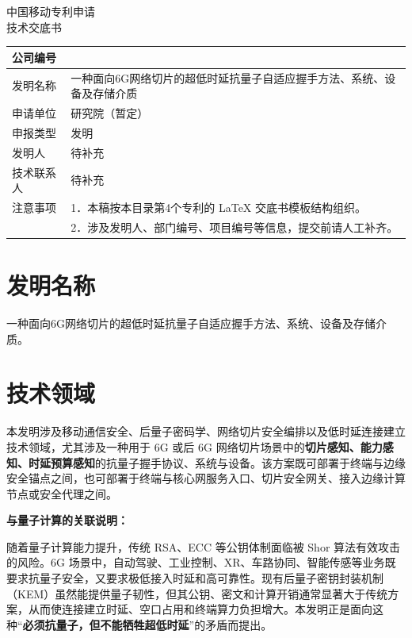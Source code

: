 \documentclass[12pt,a4paper]{article}
\begin{document}
\begin{center}
    {\Large\heiti 中国移动专利申请} \\[1em]
    {\Huge\heiti 技术交底书} \\[1em]
\end{center}

\noindent
\begin{tabular}{|p{3cm}|p{12cm}|}
\hline
公司编号 &  \\ \hline
发明名称 & 一种面向6G网络切片的超低时延抗量子自适应握手方法、系统、设备及存储介质 \\ \hline
申请单位 & 研究院（暂定） \\ \hline
申报类型 & 发明 \\ \hline
发明人 & 待补充 \\ \hline
技术联系人 & 待补充 \\ \hline
注意事项 & 1．本稿按本目录第4个专利的 LaTeX 交底书模板结构组织。\\
& 2．涉及发明人、部门编号、项目编号等信息，提交前请人工补齐。 \\ \hline
\end{tabular}

\vspace{1cm}

\section{发明名称}

一种面向6G网络切片的超低时延抗量子自适应握手方法、系统、设备及存储介质。

\section{技术领域}

本发明涉及移动通信安全、后量子密码学、网络切片安全编排以及低时延连接建立技术领域，尤其涉及一种用于 6G 或后 6G 网络切片场景中的\textbf{切片感知、能力感知、时延预算感知}的抗量子握手协议、系统与设备。该方案既可部署于终端与边缘安全锚点之间，也可部署于终端与核心网服务入口、切片安全网关、接入边缘计算节点或安全代理之间。

\textbf{与量子计算的关联说明：}

随着量子计算能力提升，传统 RSA、ECC 等公钥体制面临被 Shor 算法有效攻击的风险。6G 场景中，自动驾驶、工业控制、XR、车路协同、智能传感等业务既要求抗量子安全，又要求极低接入时延和高可靠性。现有后量子密钥封装机制（KEM）虽然能提供量子韧性，但其公钥、密文和计算开销通常显著大于传统方案，从而使连接建立时延、空口占用和终端算力负担增大。本发明正是面向这种“\textbf{必须抗量子，但不能牺牲超低时延}”的矛盾而提出。
\end{document}
